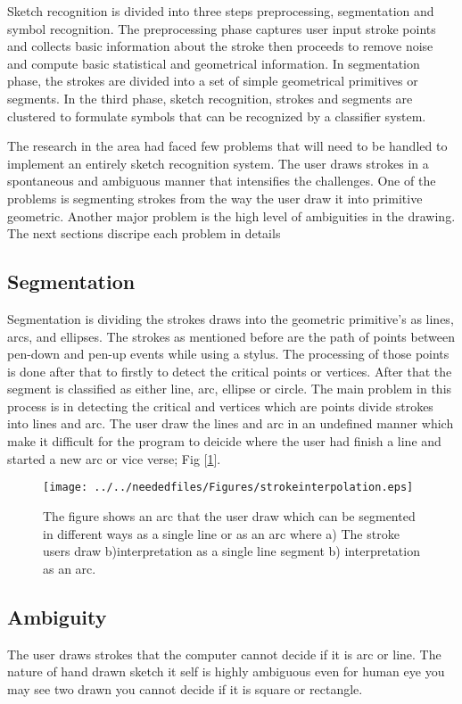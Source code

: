 Sketch recognition is divided into three steps preprocessing, segmentation and symbol recognition. The preprocessing phase captures user input stroke points and collects basic information about the stroke then proceeds to remove noise and compute basic statistical and geometrical information. In segmentation phase, the strokes are divided into a set of simple geometrical primitives or segments. In the third phase, sketch recognition, strokes and segments are clustered to formulate symbols that can be recognized by a classifier system. 

The research in the area had faced few problems that will need to be handled to implement an entirely sketch recognition system. The user draws strokes in a spontaneous and ambiguous manner that intensifies the challenges. One of the problems is segmenting strokes from the way the user draw it into primitive geometric. Another major problem is the high level of ambiguities in the drawing. The next sections discripe each problem in details 
\subsection {Segmentation}
Segmentation is dividing the strokes draws into the geometric primitive's as lines, arcs, and ellipses. The strokes as mentioned before are the path of points between pen-down and pen-up events while using a stylus. The processing of those points is done after that to firstly to detect the critical points or vertices. After that the segment is classified as either line, arc, ellipse or circle. The main problem in this process is in detecting the critical and vertices which are points divide strokes into lines and arc. The user draw the lines and arc in an undefined manner which make it difficult for the program to deicide where the user had finish a line and started a new arc or vice verse; Fig [\ref {fig:strokeinterpolation}].


\begin{figure}

		\texttt{[image: ../../neededfiles/Figures/strokeinterpolation.eps]}
	\caption[Segmentation error]{The figure shows an arc that the user draw which can be segmented in different ways as a single line or as an arc where a) The stroke users draw  b)interpretation as a single line segment  b) interpretation as an arc.}
	\label{fig:strokeinterpolation}
\end{figure}

\subsection{Ambiguity}
The user draws strokes that the computer cannot decide if it is arc or line. The nature of hand drawn sketch it self is highly ambiguous even for human eye you may see two drawn you cannot decide if it is square or rectangle.

